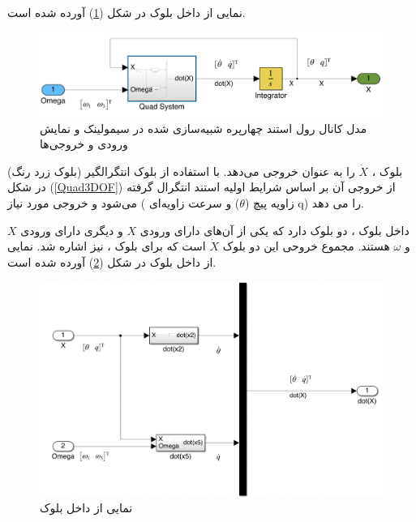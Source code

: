 نمایی از داخل بلوک
در شکل (\ref{Quad1DOF_pitch}) آورده شده است.
\begin{figure}[H]
	\includegraphics[width=16cm]{../../Figures/QuadSimulation/pitch_Integrator.png}
	\centering
	\vspace*{-15mm}
	\caption{مدل کانال رول استند چهارپره شبیه‌سازی شده در سیمولینک و نمایش ورودی و خروجی‌ها}
	\label{Quad1DOF_pitch}
\end{figure}
بلوک
،
$\dot X$ را به عنوان خروجی می‌دهد. با استفاده از بلوک انتگرالگیر (بلوک زرد رنگ) در شکل
(\ref{Quad3DOF})
از خروجی آن بر اساس شرایط اولیه استند انتگرال گرفته می‌شود و خروجی مورد نیاز ( زاویه پیچ ($\theta$) و سرعت زاویه‌ای‌
q)
را می دهد.

داخل بلوک
،
دو بلوک دارد که یکی از آن‌های دارای ورودی $X$ و دیگری دارای ورودی $X$ و $\omega$ هستند. مجموع خروحی این دو بلوک $\dot X$ است که برای بلوک
،
نیز اشاره شد.
نمایی از داخل بلوک
در شکل (\ref{pitch_all-six}) آورده شده است.
\begin{figure}[H]
	\includegraphics[width=16cm]{../../Figures/QuadSimulation/pitch_all-six.png}
	\centering
	\caption{نمایی از داخل بلوک }
	\label{pitch_all-six}
\end{figure}

